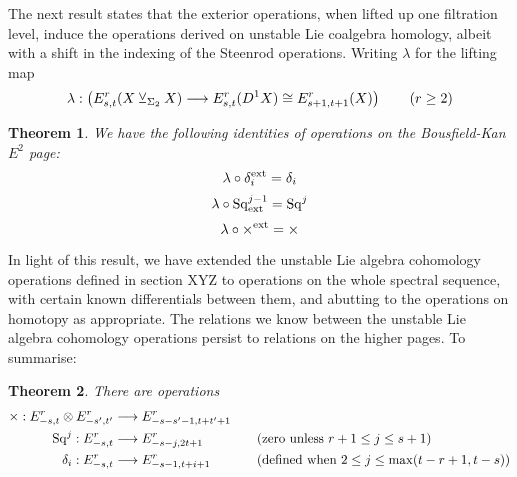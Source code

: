 \documentclass[11pt]{amsart}
\theoremstyle{plain}
\newtheorem{thm}{Theorem}[section]
\theoremstyle{definition}
\renewcommand{\to}{\longrightarrow}
\newcommand{\squishlist}{
  \setlength{\itemsep}{.5pt}
  \setlength{\parskip}{0pt}
  \setlength{\parsep}{0pt}}
\theoremstyle{plain}
\newcommand{\Sq}{\mathrm{Sq}}
\newcommand{\smashcoprod}{\veebar}%
\begin{document}
\begin{Operations on the Bousfield-Kan spectral sequence}
\begin{shaded}\tiny
The next result states that the exterior operations, when lifted up one filtration level, induce the operations derived on unstable Lie coalgebra homology, albeit with a shift in the indexing of the Steenrod operations. Writing $\lambda$ for the lifting map
\[\lambda:\left(E^r_{s,t}(X\smashcoprod_{\Sigma_2}X)\to E^r_{s,t}(D^1X)\cong E^r_{s+1,t+1}(X)\right)\textup{$\qquad (r\geq2)$}\]
\begin{thm}
We have the following identities of operations on the Bousfield-Kan $E^2$ page:
\[\lambda\circ\delta_i^\textup{ext}=\delta_i\]
\[\lambda\circ\Sq^{j-1}_\textup{ext}=\Sq^j\]
\[\lambda\circ\times^\textup{ext}=\times\]
\end{thm}
In light of this result, we have extended the unstable Lie algebra cohomology operations defined in section XYZ to operations on the whole spectral sequence, with certain known differentials between them, and abutting to the operations on homotopy as appropriate. The relations we know between the unstable Lie algebra cohomology operations persist to relations on the higher pages. To summarise:
\begin{thm}
There are operations
\begin{alignat*}{2}
\times:E^r_{-s,t}\otimes E^r_{-s',t'}&\to E^r_{-s-s'-1,t+t'+1}&&\\
\Sq^j:E^r_{-s,t}&\to E^r_{-s-j,2t+1}&&\textup{\quad (zero unless $r+1\leq j\leq s+1$)}\\
\delta_i:E^r_{-s,t}&\to E^r_{-s-1,t+i+1}&&\textup{\quad (defined when $2\leq j\leq\max(t-r+1,t-s)$)}
\end{alignat*}
\end{thm}
\end{shaded}
\end{Operations on the Bousfield-Kan spectral sequence}
\end{document}

